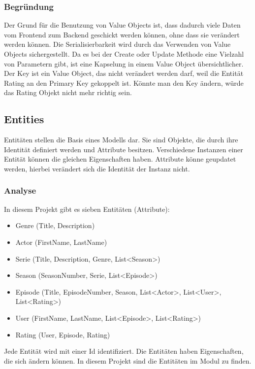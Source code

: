         \subsubsection{Begründung}
        Der Grund für die Benutzung von Value Objects ist, dass dadurch viele Daten vom Frontend zum Backend geschickt werden können, ohne dass sie verändert werden können. Die Serialisierbarkeit wird durch das Verwenden von Value Objects sichergestellt. Da es bei der Create oder Update Methode eine Vielzahl von Parametern gibt, ist eine Kapselung in einem Value Object übersichtlicher.
        Der Key ist ein Value Object, das nicht verändert werden darf, weil die Entität Rating an den Primary Key gekoppelt ist. Könnte man den Key ändern, würde das Rating Objekt nicht mehr richtig sein.

    \subsection{Entities} \label{1.entities}
    Entitäten stellen die Basis eines Modells dar. Sie sind Objekte, die durch ihre Identität definiert werden und Attribute besitzen. Verschiedene Instanzen einer Entität können die gleichen Eigenschaften haben. Attribute könne geupdatet werden, hierbei verändert sich die Identität der Instanz nicht. 

        \subsubsection{Analyse}
        In diesem Projekt gibt es sieben Entitäten (Attribute):
        \begin{itemize}
            \item Genre (Title, Description)
            \item Actor (FirstName, LastName)
            \item Serie (Title, Description, Genre, List<Season>)
            \item Season (SeasonNumber, Serie, List<Episode>)
            \item Episode (Title, EpisodeNumber, Season, List<Actor>, List<User>, List<Rating>)
            \item User (FirstName, LastName, List<Episode>, List<Rating>)
            \item Rating (User, Episode, Rating)
        \end{itemize}
        Jede Entität wird mit einer Id identifiziert. Die Entitäten haben Eigenschaften, die sich ändern können. In diesem Projekt sind die Entitäten im Modul  zu finden.

